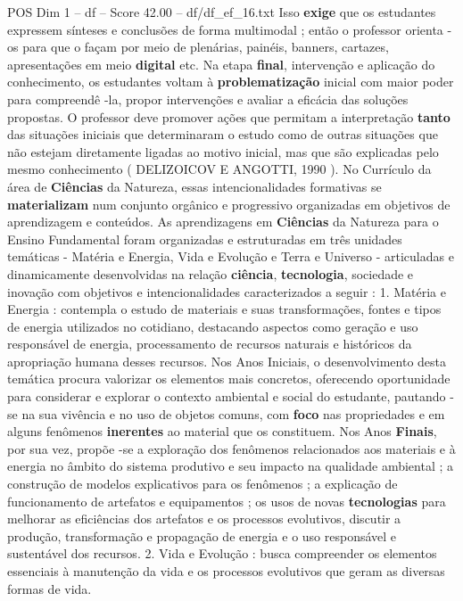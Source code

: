 \begin{textsample}{POS Dim 1 – df – Score 42.00 – df/df\_ef\_16.txt}
Isso \textbf{exige} que os estudantes expressem sínteses e conclusões de forma multimodal ; então o professor orienta -os para que o façam por meio de plenárias, painéis, banners, cartazes, apresentações em meio \textbf{digital} etc.
Na etapa \textbf{final}, intervenção e aplicação do conhecimento, os estudantes voltam à \textbf{problematização} inicial com maior poder para compreendê -la, propor intervenções e avaliar a eficácia das soluções propostas.
O professor deve promover ações que permitam a interpretação \textbf{tanto} das situações iniciais que determinaram o estudo como de outras situações que não estejam diretamente ligadas ao motivo inicial, mas que são explicadas pelo mesmo conhecimento ( DELIZOICOV E ANGOTTI, 1990 ).
No Currículo da área de \textbf{Ciências} da Natureza, essas intencionalidades formativas se \textbf{materializam} num conjunto orgânico e progressivo organizadas em objetivos de aprendizagem e conteúdos.
As aprendizagens em \textbf{Ciências} da Natureza para o Ensino Fundamental foram organizadas e estruturadas em três unidades temáticas - Matéria e Energia, Vida e Evolução e Terra e Universo - articuladas e dinamicamente desenvolvidas na relação \textbf{ciência}, \textbf{tecnologia}, sociedade e inovação com objetivos e intencionalidades caracterizados a seguir : 1.
Matéria e Energia : contempla o estudo de materiais e suas transformações, fontes e tipos de energia utilizados no cotidiano, destacando aspectos como geração e uso responsável de energia, processamento de recursos naturais e históricos da apropriação humana desses recursos.
Nos Anos Iniciais, o desenvolvimento desta temática procura valorizar os elementos mais concretos, oferecendo oportunidade para considerar e explorar o contexto ambiental e social do estudante, pautando -se na sua vivência e no uso de objetos comuns, com \textbf{foco} nas propriedades e em alguns fenômenos \textbf{inerentes} ao material que os constituem.
Nos Anos \textbf{Finais}, por sua vez, propõe -se a exploração dos fenômenos relacionados aos materiais e à energia no âmbito do sistema produtivo e seu impacto na qualidade ambiental ; a construção de modelos explicativos para os fenômenos ; a explicação de funcionamento de artefatos e equipamentos ; os usos de novas \textbf{tecnologias} para melhorar as eficiências dos artefatos e os processos evolutivos, discutir a produção, transformação e propagação de energia e o uso responsável e sustentável dos recursos. 2.
Vida e Evolução : busca compreender os elementos essenciais à manutenção da vida e os processos evolutivos que geram as diversas formas de vida.

\end{textsample}
